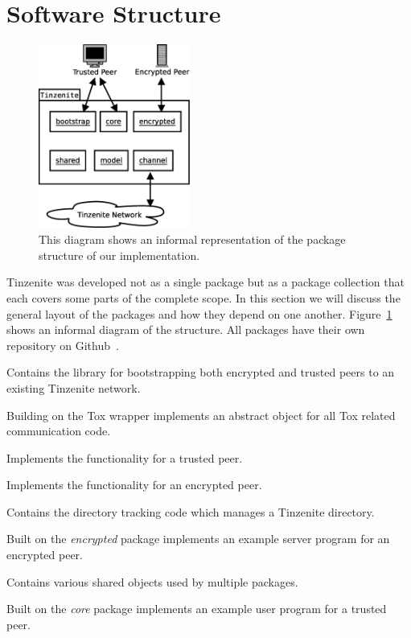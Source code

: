 \section{Software Structure}
\label{sec:Software Structure}

\begin{figure}[htp]
\centering
    \includegraphics[width=5cm]{diagram/topo_implementation}
\caption[Tinzenite Structure]{This diagram shows an informal representation of the package structure of our implementation.}
\label{fig:implementation_structure}
\end{figure}

Tinzenite was developed not as a single package but as a package collection that each covers some parts of the complete scope.
In this section we will discuss the general layout of the packages and how they depend on one another.
Figure~\ref{fig:implementation_structure} shows an informal diagram of the structure.
All packages have their own repository on Github~\cite{web:site:github:tinzenite}.

\begin{description}[leftmargin=6em,style=nextline,noitemsep,nolistsep]
    \item[bootstrap]
        Contains the library for bootstrapping both encrypted and trusted peers to an existing Tinzenite network.
    \item[channel]
        Building on the Tox wrapper implements an abstract object for all Tox related communication code.
    \item[core]
        Implements the functionality for a trusted peer.
    \item[encrypted]
        Implements the functionality for an encrypted peer.
    \item[model]
        Contains the directory tracking code which manages a Tinzenite directory.
    \item[server]
        Built on the \emph{encrypted} package implements an example server program for an encrypted peer.
    \item[shared]
        Contains various shared objects used by multiple packages.
    \item[tin]
        Built on the \emph{core} package implements an example user program for a trusted peer.
\end{description}

